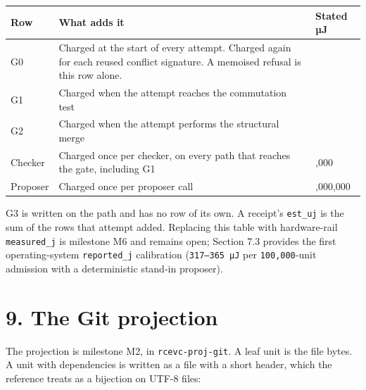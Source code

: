\documentclass[10pt,letterpaper]{article}
\newcounter{none}
\begin{document}
{\def\LTcaptype{none} %
{\footnotesize\setlength{\tabcolsep}{3.8pt}\renewcommand{\arraystretch}{1.15}
\begin{longtable}[]{@{}
  >{\raggedright\arraybackslash}p{}
  >{\raggedright\arraybackslash}p{}
  >{\raggedleft\arraybackslash}p{}@{}}
\toprule\noalign{}
\begin{minipage}[b]{\linewidth}\raggedright
\textbf{Row}
\end{minipage} & \begin{minipage}[b]{\linewidth}\raggedright
\textbf{What adds it}
\end{minipage} & \begin{minipage}[b]{\linewidth}\raggedleft
\textbf{Stated µJ}
\end{minipage} \\
\midrule\noalign{}
\endhead
\bottomrule\noalign{}
\endlastfoot
G0 & Charged at the start of every attempt. Charged again for each
reused conflict signature. A memoised refusal is this row alone. & 1 \\
G1 & Charged when the attempt reaches the commutation test & 10 \\
G2 & Charged when the attempt performs the structural merge & 100 \\
Checker & Charged once per checker, on every path that reaches the gate,
including G1 & 1,000 \\
Proposer & Charged once per proposer call & 5,000,000 \\
\end{longtable}
}
}

G3 is written on the path and has no row of its own. A receipt's
\texttt{est\_uj} is the sum of the rows that attempt added. Replacing
this table with hardware-rail \texttt{measured\_j} is milestone M6 and
remains open; Section 7.3 provides the first operating-system
\texttt{reported\_j} calibration (\texttt{317–365\ µJ} per
\texttt{100,000}-unit admission with a deterministic stand-in proposer).

\section{9. The Git projection}\label{the-git-projection}

The projection is milestone M2, in \texttt{rcevc-proj-git}. A leaf unit
is the file bytes. A unit with dependencies is written as a file with a
short header, which the reference treats as a bijection on UTF-8 files:
\end{document}
